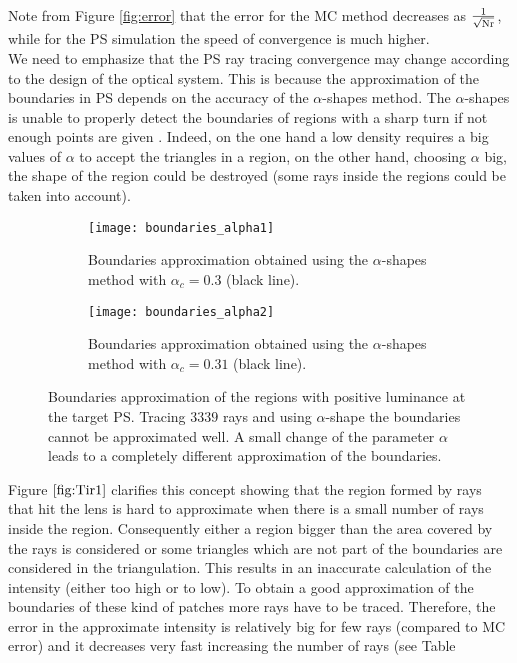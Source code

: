 Note from Figure \ref{fig:error} that the error for the MC method decreases as $\frac{1}{\sqrt{\textrm{Nr}}}$, while for the PS simulation the speed of convergence is much higher.\\ \indent
We need to emphasize that the PS ray tracing convergence may change according to the design of the optical system.
This is because the approximation of the boundaries in PS depends on the accuracy of the $\alpha$-shapes method.
The $\alpha$-shapes is unable to properly detect the boundaries of regions with a sharp turn if not enough points are given
\cite{teichmann1998surface}. Indeed, on the one hand a low density requires a big values of $\alpha$ to accept the triangles in a region, on the other hand,
 choosing $\alpha$ big, the shape of the region could be destroyed (some rays inside the regions could be taken into account).
\begin{figure}[h]
\centering
\begin{subfigure}{.48\textwidth}
  \centering
  \texttt{[image: boundaries\_alpha1]}
  \caption{Boundaries approximation obtained using the $\alpha$-shapes method with $\alpha_c = 0.3$ (black line).}
\end{subfigure}
\begin{subfigure}{.48\textwidth}
  \centering
  \texttt{[image: boundaries\_alpha2]}
  \caption{Boundaries approximation obtained using the $\alpha$-shapes method with $\alpha_c = 0.31$ (black line).}
\end{subfigure}
\caption{Boundaries approximation of the regions with positive luminance at the target PS. Tracing $3339$ rays and using $\alpha$-shape the boundaries cannot be approximated well. 
A small change of the parameter $\alpha$ leads to a completely different approximation of the boundaries.}
\label{fig:Tir1}
\end{figure}
Figure $\ref{fig:Tir1}$ clarifies this concept showing that the region formed by rays that hit the lens is hard to approximate when there is a small number of rays inside the region. Consequently either a region bigger than the area covered by the rays is considered or some triangles which are not part of the boundaries are considered in the triangulation. This results in an inaccurate calculation of the intensity (either too high or to low). To obtain a good approximation of the boundaries of these kind of patches more rays have to be traced. Therefore, the error in the approximate intensity is relatively big for few rays (compared to MC error) and it decreases very fast increasing the number of rays (see Table

